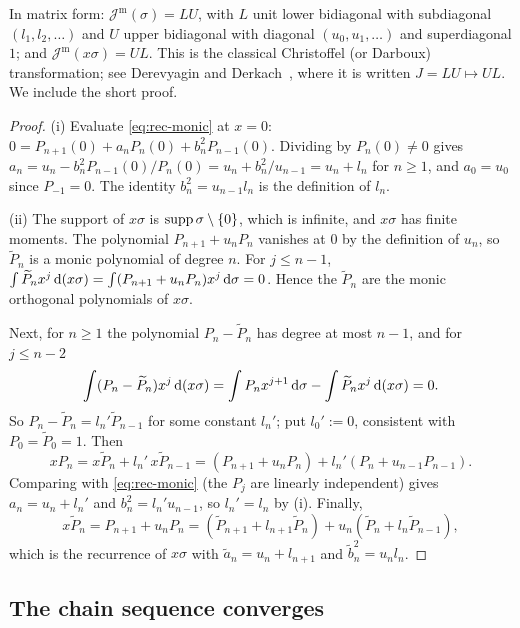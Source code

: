 In matrix form: $\mathcal J^{\mathrm m}(\sigma)=LU$, with $L$ unit lower bidiagonal with subdiagonal $(l_1,l_2,\dots)$ and $U$ upper
bidiagonal with diagonal $(u_0,u_1,\dots)$ and superdiagonal $1$; and $\mathcal J^{\mathrm m}(x\sigma)=UL$. This is the classical Christoffel
(or Darboux) transformation; see Derevyagin and Derkach~\cite[\S1]{DD}, where it is written $J=LU\mapsto UL$. We include
the short proof.

\begin{proof}
(i) Evaluate \eqref{eq:rec-monic} at $x=0$: $0=P_{n+1}(0)+a_nP_n(0)+b_n^2P_{n-1}(0)$. Dividing by $P_n(0)\ne0$ gives
$a_n=u_n-b_n^2P_{n-1}(0)/P_n(0)=u_n+b_n^2/u_{n-1}=u_n+l_n$ for $n\ge1$, and $a_0=u_0$ since $P_{-1}=0$. The identity
$b_n^2=u_{n-1}l_n$ is the definition of $l_n$.

(ii) The support of $x\sigma$ is $\operatorname{supp}\sigma\setminus\{0\}$, which is infinite, and $x\sigma$ has finite moments. The
polynomial $P_{n+1}+u_nP_n$ vanishes at $0$ by the definition of $u_n$, so $\widetilde P_n$ is a monic polynomial of
degree $n$. For $j\le n-1$, $\int\widetilde P_nx^j\,\mathrm{d}(x\sigma)=\int(P_{n+1}+u_nP_n)x^j\,\mathrm{d}\sigma=0$. Hence the
$\widetilde P_n$ are the monic orthogonal polynomials of $x\sigma$.

Next, for $n\ge1$ the polynomial $P_n-\widetilde P_n$ has degree at most $n-1$, and for $j\le n-2$
\[
  \int(P_n-\widetilde P_n)x^j\,\mathrm{d}(x\sigma)=\int P_nx^{j+1}\,\mathrm{d}\sigma-\int\widetilde P_nx^j\,\mathrm{d}(x\sigma)=0 .
\]
So $P_n-\widetilde P_n=l_n'\widetilde P_{n-1}$ for some constant $l_n'$; put $l_0':=0$, consistent with
$P_0=\widetilde P_0=1$. Then
\[
  xP_n=x\widetilde P_n+l_n'\,x\widetilde P_{n-1}=(P_{n+1}+u_nP_n)+l_n'(P_n+u_{n-1}P_{n-1}).
\]
Comparing with \eqref{eq:rec-monic} (the $P_j$ are linearly independent) gives $a_n=u_n+l_n'$ and $b_n^2=l_n'u_{n-1}$,
so $l_n'=l_n$ by (i). Finally,
\[
  x\widetilde P_n=P_{n+1}+u_nP_n=(\widetilde P_{n+1}+l_{n+1}\widetilde P_n)+u_n(\widetilde P_n+l_n\widetilde P_{n-1}),
\]
which is the recurrence of $x\sigma$ with $\tilde a_n=u_n+l_{n+1}$ and $\tilde b_n^2=u_nl_n$.
\end{proof}

\subsection{The chain sequence converges}


